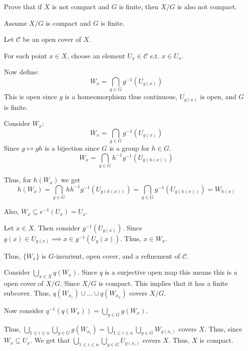 \documentclass[12pt, letterpaper]{article}
\begin{document}
\begin{subproblem}{}
    Prove that if $X$ is not compact and $G$ is finite, then
    $X / G$ is also not compact.
\end{subproblem}
\begin{problemproof}
    Assume $X/G$ is compact and $G$ is finite.

    Let $\mathcal{C}$ be an open cover of $X$.

    For each point $x \in X$, choose an element $U_x \in \mathcal{C}$ s.t. $x \in U_x$.

    Now define:
    \[W_x = \bigcap_{g \in G} g^{-1}(U_{g(x)})\]
    This is open since $g$ is a homeomorphism thus continuous, $U_{g(x)}$ is open, and $G$ is finite.

    Consider $W_x$:
    \[W_x=\bigcap_{g \in G} g^{-1}(U_{g(x)})\]
    Since $g \mapsto gh$ is a bijection since $G$ is a group for $h \in G$.
    \[W_x=\bigcap_{g \in G} h^{-1}g^{-1}(U_{g(h(x))})\]

    Thus, for $h(W_x)$ we get
    \[h(W_x)=\bigcap_{g \in G} hh^{-1}g^{-1}(U_{g(h(x))})=\bigcap_{g \in G} g^{-1}(U_{g(h(x))})=W_{h(x)}\]

    Also, $W_x \subseteq e^{-1}(U_x)=U_x$.

    Let $x \in X$. Then consider $g^{-1}(U_{g(x)})$. Since $g(x) \in U_{g(x)} \implies x \in g^{-1}(U_g(x))$. Thus, $x \in W_x$.

    Thus, $\{W_x\}$ is $G$-invarient, open cover, and a refinement of $\mathcal{C}$.

    Consider $\bigcup_{x \in X}q(W_x)$. Since $q$ is a surjective open map this means this is a open cover of $X/G$. Since $X/G$ is compact. This implies that it has a finite subcover. Thus, $q(W_{x_1}) \cup \dots \cup q(W_{x_n})$ covers $X/G$.

    Now consider $q^{-1}(q(W_x))=\bigcup_{g \in G}g(W_x)$.

    Thus, $\bigcup_{1 \leq i \leq n}\bigcup_{g \in G}g(W_{x_i})=\bigcup_{1 \leq i \leq n}\bigcup_{g \in G}W_{g(x_i)}$ covers $X$. Thus, since $W_x \subseteq U_x$. We get that $\bigcup_{1 \leq i \leq n}\bigcup_{g \in G}U_{g(x_i)}$ covers $X$. Thus, $X$ is compact.
\end{problemproof}
\end{document}
